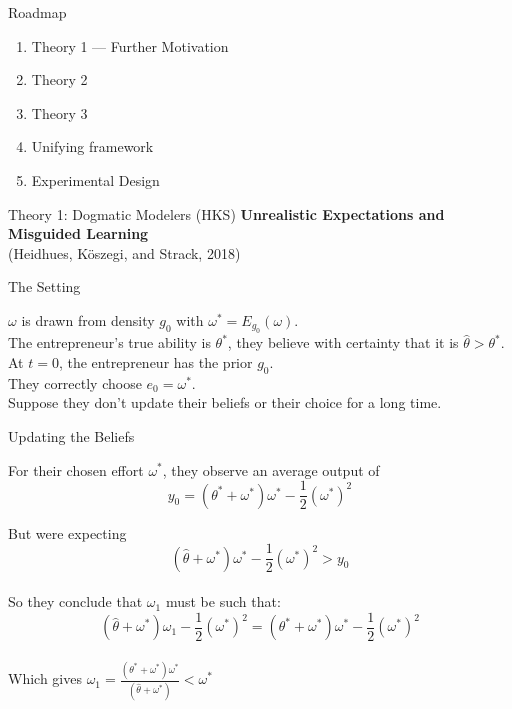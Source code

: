 \documentclass[aspectratio=169]{beamer}
\begin{document}
\begin{frame}{Roadmap}
    \begin{enumerate}
        \item Theory 1 --- Further Motivation\\
        \bigskip
        \item Theory 2\\
        \bigskip
        \item Theory 3\\
        \bigskip
        \item Unifying framework\\
        \bigskip
        \item Experimental Design
    \end{enumerate}
\end{frame}

\begin{frame}{Theory 1: Dogmatic Modelers (HKS)}
    \Large\textbf{Unrealistic Expectations and Misguided Learning \\}
    (Heidhues, Köszegi, and Strack, 2018)
\end{frame}

\begin{frame}{The Setting}

$\omega$ is drawn from density $g_0$ with $\omega^*=E_{g_0}(\omega).$\\
\bigskip
The entrepreneur's true ability is $\theta^*$, they believe with certainty that it is $\hat\theta>\theta^*.$ \\
\bigskip
At $t=0$, the entrepreneur has the prior $g_0.$\\
\bigskip
They correctly choose $e_0 = \omega^*.$\\
\bigskip
\pause
Suppose they don't update their beliefs or their choice for a long time.
\end{frame}

\begin{frame}{Updating the Beliefs}

For their chosen effort $\omega^*$, they observe an average output of 
$$ y_0=(\theta^* + \omega^*)\omega^*-\frac{1}{2}(\omega^*)^2 $$

But were expecting
$$ (\hat\theta + \omega^*)\omega^*-\frac{1}{2}(\omega^*)^2 > y_0$$\\
\bigskip
\pause
So they conclude that $\omega_1$ must be such that:
$$(\hat \theta + \omega^*)\omega_1-\frac{1}{2}(\omega^*)^2 = (\theta^* + \omega^*)\omega^*-\frac{1}{2}(\omega^*)^2 $$\\
\bigskip 
Which gives $\omega_1 = \frac{(\theta^* + \omega^*)\omega^*}{(\hat \theta + \omega^*)}<\omega^*$
    
\end{frame}
\end{document}
